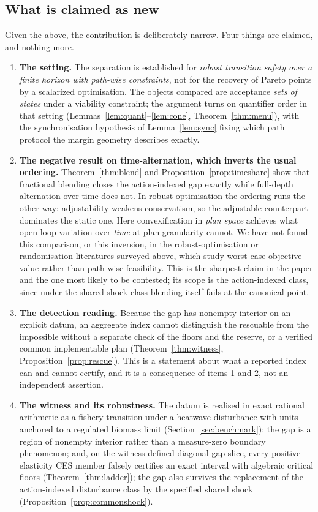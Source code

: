 \subsection{What is claimed as new}\label{sec:whatisnew}

Given the above, the contribution is deliberately narrow. Four things are claimed, and nothing more.
\begin{enumerate}[leftmargin=2em]
\item \textbf{The setting.} The separation is established for \emph{robust transition safety over a finite horizon with path-wise constraints}, not for the recovery of Pareto points by a scalarized optimisation. The objects compared are acceptance \emph{sets of states} under a viability constraint; the argument turns on quantifier order in that setting (Lemmas~\ref{lem:quant}--\ref{lem:cone}, Theorem~\ref{thm:menu}), with the synchronisation hypothesis of Lemma~\ref{lem:sync} fixing which path protocol the margin geometry describes exactly.
\item \textbf{The negative result on time-alternation, which inverts the usual ordering.} Theorem~\ref{thm:blend} and Proposition~\ref{prop:timeshare} show that fractional blending closes the action-indexed gap exactly while full-depth alternation over time does not. In robust optimisation the ordering runs the other way: adjustability weakens conservatism, so the adjustable counterpart dominates the static one. Here convexification in \emph{plan space} achieves what open-loop variation over \emph{time} at plan granularity cannot. We have not found this comparison, or this inversion, in the robust-optimisation or randomisation literatures surveyed above, which study worst-case objective value rather than path-wise feasibility. This is the sharpest claim in the paper and the one most likely to be contested; its scope is the action-indexed class, since under the shared-shock class blending itself fails at the canonical point.
\item \textbf{The detection reading.} Because the gap has nonempty interior on an explicit datum, an aggregate index cannot distinguish the rescuable from the impossible without a separate check of the floors and the reserve, or a verified common implementable plan (Theorem~\ref{thm:witness}, Proposition~\ref{prop:rescue}). This is a statement about what a reported index can and cannot certify, and it is a consequence of items 1 and 2, not an independent assertion.
\item \textbf{The witness and its robustness.} The datum is realised in exact rational arithmetic as a fishery transition under a heatwave disturbance with units anchored to a regulated biomass limit (Section~\ref{sec:benchmark}); the gap is a region of nonempty interior rather than a measure-zero boundary phenomenon; and, on the witness-defined diagonal gap slice, every positive-elasticity CES member falsely certifies an exact interval with algebraic critical floors (Theorem~\ref{thm:ladder}); the gap also survives the replacement of the action-indexed disturbance class by the specified shared shock (Proposition~\ref{prop:commonshock}).
\end{enumerate}
